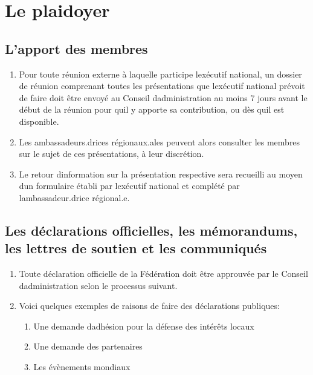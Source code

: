 \section{Le plaidoyer}
\label{le-plaidoyer}

\subsection{L'apport des membres}
\label{lapport-des-membres}

\begin{enumerate}
 \item
  Pour toute réunion externe à laquelle participe l\textquotesingle exécutif national, un dossier de réunion comprenant toutes les présentations que l\textquotesingle exécutif national prévoit de faire doit être envoyé au Conseil d\textquotesingle administration au moins 7 jours avant le début de la réunion pour qu\textquotesingle il y apporte sa contribution, ou dès qu\textquotesingle il est disponible.
 \item
  Les ambassadeurs.drices régionaux.ales peuvent alors consulter les membres sur le sujet de ces présentations, à leur discrétion.
 \item
  Le retour d\textquotesingle information sur la présentation respective sera recueilli au moyen d\textquotesingle un formulaire établi par l\textquotesingle exécutif national et complété par l\textquotesingle ambassadeur.drice régional.e.
\end{enumerate}

\subsection{Les déclarations officielles, les mémorandums, les lettres de soutien et les communiqués}
\label{les-declarations-officielles-les-memorandums-les-lettres-de-soutien-et-les-communiques}

\begin{enumerate}
 \item
  Toute déclaration officielle de la Fédération doit être approuvée par le Conseil d\textquotesingle administration selon le processus suivant.
 \item
  Voici quelques exemples de raisons de faire des déclarations publiques:

  \begin{enumerate}
   \item
    Une demande d\textquotesingle adhésion pour la défense des intérêts locaux
   \item
    Une demande des partenaires
   \item
    Les évènements mondiaux
  \end{enumerate}
\end{enumerate}

